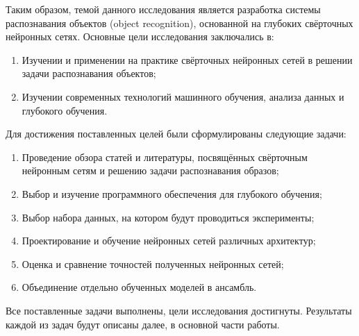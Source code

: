 Таким образом, темой данного исследования является разработка системы распознавания объектов
(object recognition), основанной на глубоких свёрточных нейронных сетях.
Основные цели исследования заключались в:
\begin{enumerate}
    \item Изучении и применении на практике свёрточных нейронных сетей в решении задачи распознавания объектов;
    \item Изучении современных технологий машинного обучения, анализа данных и глубокого обучения.
\end{enumerate}
Для достижения поставленных целей были сформулированы следующие задачи:
\begin{enumerate}
    \item Проведение обзора статей и литературы, посвящённых свёрточным нейронным сетям и решению
    задачи распознавания образов;
    \item Выбор и изучение программного обеспечения для глубокого обучения;
    \item Выбор набора данных, на котором будут проводиться эксперименты;
    \item Проектирование и обучение нейронных сетей различных архитектур;
    \item Оценка и сравнение точностей полученных нейронных сетей;
    \item Объединение отдельно обученных моделей в ансамбль.
\end{enumerate}
Все поставленные задачи выполнены, цели исследования достигнуты. Результаты каждой из задач будут 
описаны далее, в основной части работы.
